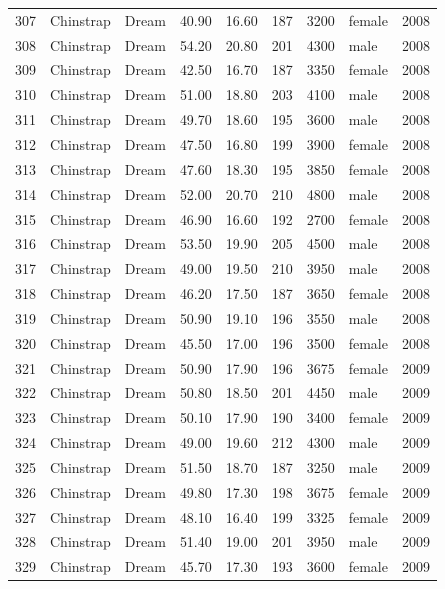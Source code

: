\documentclass{article}\usepackage[]{graphicx}\usepackage[]{xcolor}
\begin{document}
\begin{table}[ht]
\begin{tabular}{rllrrrrlr}
  307 & Chinstrap & Dream & 40.90 & 16.60 & 187 & 3200 & female & 2008 \\ 
  308 & Chinstrap & Dream & 54.20 & 20.80 & 201 & 4300 & male & 2008 \\ 
  309 & Chinstrap & Dream & 42.50 & 16.70 & 187 & 3350 & female & 2008 \\ 
  310 & Chinstrap & Dream & 51.00 & 18.80 & 203 & 4100 & male & 2008 \\ 
  311 & Chinstrap & Dream & 49.70 & 18.60 & 195 & 3600 & male & 2008 \\ 
  312 & Chinstrap & Dream & 47.50 & 16.80 & 199 & 3900 & female & 2008 \\ 
  313 & Chinstrap & Dream & 47.60 & 18.30 & 195 & 3850 & female & 2008 \\ 
  314 & Chinstrap & Dream & 52.00 & 20.70 & 210 & 4800 & male & 2008 \\ 
  315 & Chinstrap & Dream & 46.90 & 16.60 & 192 & 2700 & female & 2008 \\ 
  316 & Chinstrap & Dream & 53.50 & 19.90 & 205 & 4500 & male & 2008 \\ 
  317 & Chinstrap & Dream & 49.00 & 19.50 & 210 & 3950 & male & 2008 \\ 
  318 & Chinstrap & Dream & 46.20 & 17.50 & 187 & 3650 & female & 2008 \\ 
  319 & Chinstrap & Dream & 50.90 & 19.10 & 196 & 3550 & male & 2008 \\ 
  320 & Chinstrap & Dream & 45.50 & 17.00 & 196 & 3500 & female & 2008 \\ 
  321 & Chinstrap & Dream & 50.90 & 17.90 & 196 & 3675 & female & 2009 \\ 
  322 & Chinstrap & Dream & 50.80 & 18.50 & 201 & 4450 & male & 2009 \\ 
  323 & Chinstrap & Dream & 50.10 & 17.90 & 190 & 3400 & female & 2009 \\ 
  324 & Chinstrap & Dream & 49.00 & 19.60 & 212 & 4300 & male & 2009 \\ 
  325 & Chinstrap & Dream & 51.50 & 18.70 & 187 & 3250 & male & 2009 \\ 
  326 & Chinstrap & Dream & 49.80 & 17.30 & 198 & 3675 & female & 2009 \\ 
  327 & Chinstrap & Dream & 48.10 & 16.40 & 199 & 3325 & female & 2009 \\ 
  328 & Chinstrap & Dream & 51.40 & 19.00 & 201 & 3950 & male & 2009 \\ 
  329 & Chinstrap & Dream & 45.70 & 17.30 & 193 & 3600 & female & 2009 \\ 

\end{tabular}
\end{table}
\end{document}
